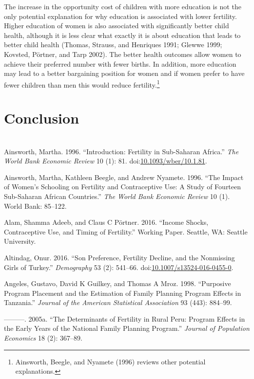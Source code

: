 \documentclass[]{article}
\begin{document}
The increase in the opportunity cost of children with more education is not the only potential explanation for why education is associated with lower fertility. Higher education of women is also associated with significantly better child health, although it is less clear what exactly it is about education that leads to better child health (Thomas, Strauss, and Henriques 1991; Glewwe 1999; Kovsted, Pörtner, and Tarp 2002). The better health outcomes allow women to achieve their preferred number with fewer births. In addition, more education may lead to a better bargaining position for women and if women prefer to have fewer children than men this would reduce fertility.\footnote{Ainsworth, Beegle, and Nyamete (1996) reviews other potential explanations.}

\section{Conclusion}\label{conclusion}

\section{}\label{section}

Ainsworth, Martha. 1996. ``Introduction: Fertility in Sub-Saharan Africa.'' \emph{The World Bank Economic Review} 10 (1): 81. doi:\href{https://doi.org/10.1093/wber/10.1.81}{10.1093/wber/10.1.81}.

Ainsworth, Martha, Kathleen Beegle, and Andrew Nyamete. 1996. ``The Impact of Women's Schooling on Fertility and Contraceptive Use: A Study of Fourteen Sub-Saharan African Countries.'' \emph{The World Bank Economic Review} 10 (1). World Bank: 85--122.

Alam, Shamma Adeeb, and Claus C Pörtner. 2016. ``Income Shocks, Contraceptive Use, and Timing of Fertility.'' Working Paper. Seattle, WA: Seattle University.

Altindag, Onur. 2016. ``Son Preference, Fertility Decline, and the Nonmissing Girls of Turkey.'' \emph{Demography} 53 (2): 541--66. doi:\href{https://doi.org/10.1007/s13524-016-0455-0}{10.1007/s13524-016-0455-0}.

Angeles, Gustavo, David K Guilkey, and Thomas A Mroz. 1998. ``Purposive Program Placement and the Estimation of Family Planning Program Effects in Tanzania.'' \emph{Journal of the American Statistical Association} 93 (443): 884--99.

---------. 2005a. ``The Determinants of Fertility in Rural Peru: Program Effects in the Early Years of the National Family Planning Program.'' \emph{Journal of Population Economics} 18 (2): 367--89.
\end{document}

